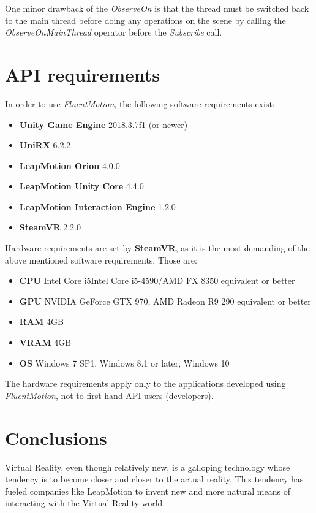 \documentclass{sigchi}
\def\fluentmotion{\textit{FluentMotion}}
\def\leap{LeapMotion}
\def\vr{Virtual Reality}
\begin{document}
One minor drawback of the \textit{ObserveOn} is that the thread must be switched back to the main thread before doing any operations on the scene by calling the \textit{ObserveOnMainThread} operator before the \textit{Subscribe} call.

\section{API requirements}

In order to use \fluentmotion{}, the following software requirements exist:

\begin{itemize}
  \item \textbf{Unity Game Engine} 2018.3.7f1 (or newer)
  \item \textbf{UniRX} 6.2.2
  \item \textbf{LeapMotion Orion} 4.0.0
  \item \textbf{LeapMotion Unity Core} 4.4.0
  \item \textbf{LeapMotion Interaction Engine} 1.2.0
  \item \textbf{SteamVR} 2.2.0 
\end{itemize}

Hardware requirements are set by \textbf{SteamVR}, as it is the most demanding of the above mentioned software requirements. Those are:

\begin{itemize}
  \item \textbf{CPU} Intel Core i5Intel Core i5-4590/AMD FX 8350 equivalent or better
  \item \textbf{GPU} NVIDIA GeForce GTX 970, AMD Radeon R9 290 equivalent or better
  \item \textbf{RAM} 4GB
  \item \textbf{VRAM} 4GB
  \item \textbf{OS} Windows 7 SP1, Windows 8.1 or later, Windows 10
\end{itemize}

The hardware requirements apply only to the applications developed using \fluentmotion{}, not to first hand API users (developers).

\section{Conclusions}
\vr{}, even though relatively new, is a galloping technology whose tendency is to become closer and closer to the actual reality. This tendency has fueled companies like \leap{} to invent new and more natural means of interacting with the \vr{} world.
\end{document}
